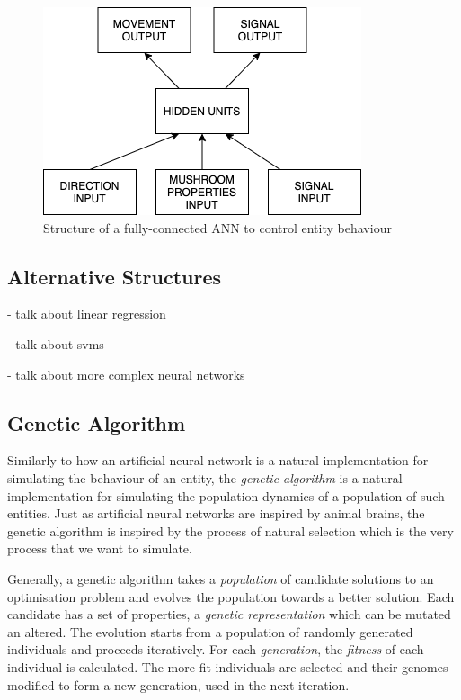 \documentclass[12pt,a4paper,twoside,openright]{report}
\begin{document}
\begin{figure}[t]
  \centering
  \includegraphics[width=.6\linewidth]{figs/NeuralNets}
  \caption{Structure of a fully-connected ANN to control entity behaviour}
  \label{fig:neuralnet}
\end{figure}

\subsection{Alternative Structures}

- talk about linear regression

- talk about svms

- talk about more complex neural networks

\subsection{Genetic Algorithm}\label{section:genetic}

Similarly to how an artificial neural network is a natural implementation for simulating the behaviour of an entity, the \emph{genetic algorithm} is a natural implementation for simulating the population dynamics of a population of such entities. Just as artificial neural networks are inspired by animal brains, the genetic algorithm is inspired by the process of natural selection which is the very process that we want to simulate. 

Generally, a genetic algorithm takes a \emph{population} of candidate solutions to an optimisation problem and evolves the population towards a better solution. Each candidate has a set of properties, a \emph{genetic representation} which can be mutated an altered. The evolution starts from a population of randomly generated individuals and proceeds iteratively. For each \emph{generation}, the \emph{fitness} of each individual is calculated. The more fit individuals are selected and their genomes modified to form a new generation, used in the next iteration.
\end{document}

